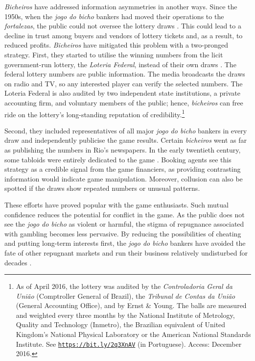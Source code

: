 \documentclass[a4paper,12pt]{article}
\begin{document}
\emph{Bicheiros} have addressed information asymmetries in another ways. Since the 1950s, when the \emph{jogo do bicho} bankers had moved their operations to the \emph{fortalezas}, the public could not oversee the lottery draws \citep[259]{chazkel2011laws}. This could lead to a decline in trust among buyers and vendors of lottery tickets and, as a result, to reduced profits. \emph{Bicheiros} have mitigated this problem with a two-pronged strategy. First, they started to utilise the winning numbers from the licit government-run lottery, the \emph{Loteria Federal}, instead of their own draws \citetext{\citealp[546]{chazkel2007beyond}; \citealp[89]{labronici2012paratodos}; \citealp[39-40]{mello1989historia}}. The federal lottery numbers are public information. The media broadcasts the draws on radio and TV, so any interested player can verify the selected numbers. The Loteria Federal is also audited by two independent state institutions, a private accounting firm, and voluntary members of the public; hence, \emph{bicheiros} can free ride on the lottery's long-standing reputation of credibility.\footnote{As of April 2016, the lottery was audited by the \emph{Controladoria Geral da União} (Comptroller General of Brazil), the \emph{Tribunal de Contas da União} (General Accounting Office), and by Ernst \& Young. The balls are measured and weighted every three months by the National Institute of Metrology, Quality and Technology (Inmetro), the Brazilian equivalent of United Kingdom's National Physical Laboratory or the American National Standards Institute. See \href{http://noticias.uol.com.br/cotidiano/ultimas-noticias/2016/04/08/auditoria-dos-sorteios-da-caixa-e-confiavel-veja-como-e-o-processo.htm}{\texttt{https://bit.ly/2q3XnAV}} (in Portuguese). Access: December 2016.}

Second, they included representatives of all major \emph{jogo do bicho} bankers in every draw and independently publicise the game results. Certain \emph{bicheiros} went as far as publishing the numbers in Rio's newspapers. In the early twentieth century, some tabloids were entirely dedicated to the game \citep[60]{magalhaes2005ganhou}. Booking agents see this strategy as a credible signal from the game financiers, as providing contrasting information would indicate game manipulation. Moreover, collusion can also be spotted if the draws show repeated numbers or unusual patterns.

These efforts have proved popular with the game enthusiasts. Such mutual confidence reduces the potential for conflict in the game. As the public does not see the \emph{jogo do bicho} as violent or harmful, the stigma of repugnance associated with gambling becomes less pervasive. By reducing the possibilities of cheating and putting long-term interests first, the \emph{jogo do bicho} bankers have avoided the fate of other repugnant markets and run their business relatively undisturbed for decades \citep[20]{da1999aguias}.
\end{document}
